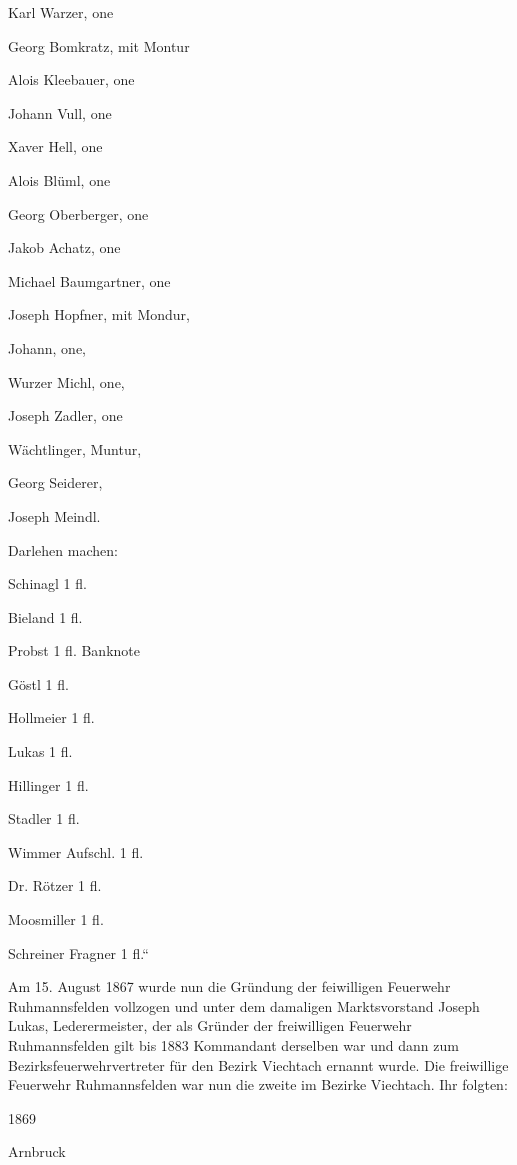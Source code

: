 \documentclass[12pt,a4paper]{book}
\begin{document}
Karl Warzer, one

Georg Bomkratz, mit Montur

Alois Kleebauer, one



Johann Vull, one

Xaver Hell, one

Alois Blüml, one

Georg Oberberger, one

Jakob Achatz, one

Michael Baumgartner, one

Joseph Hopfner, mit Mondur,

Johann, one,

Wurzer Michl, one,

Joseph Zadler, one

Wächtlinger, Muntur,

Georg Seiderer,

Joseph Meindl.







Darlehen machen:



Schinagl 1 fl.

Bieland 1 fl.

Probst 1 fl. Banknote

Göstl 1 fl.

Hollmeier 1 fl.

Lukas 1 fl.



Hillinger 1 fl.

Stadler 1 fl.

Wimmer Aufschl. 1 fl.

Dr. Rötzer 1 fl.

Moosmiller 1 fl.

Schreiner Fragner 1 fl.“



Am 15. August 1867 wurde nun die Gründung der feiwilligen Feuerwehr
Ruhmannsfelden vollzogen und unter dem damaligen Marktsvorstand Joseph Lukas,
Lederermeister, der als Gründer der freiwilligen Feuerwehr Ruhmannsfelden gilt
bis 1883 Kommandant derselben war und dann zum Bezirksfeuerwehrvertreter für den
Bezirk Viechtach ernannt wurde. Die freiwillige Feuerwehr Ruhmannsfelden war nun
die zweite im Bezirke Viechtach. Ihr folgten:



1869

Arnbruck
\end{document}
